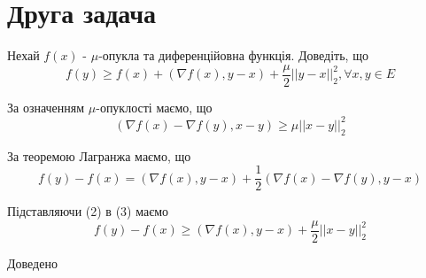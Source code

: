 \section{Друга задача}


\begin{tcolorbox}[title = Друга задача]
    Нехай $f(x)$ - $\mu$-опукла та диференційовна функція. Доведіть, що 
    \begin{equation}
        f(y) \geq f(x) + (\nabla f(x) , y - x) + \frac{\mu}{2} ||y - x||_2^2, \forall x, y \in E
    \end{equation}
\end{tcolorbox}

За означенням $\mu$-опуклості маємо, що 
\begin{equation}
    (\nabla f(x) - \nabla f(y), x - y) \geq \mu ||x - y||_2^2
\end{equation}

За теоремою Лагранжа маємо, що
\begin{equation}
    f(y) - f(x) = (\nabla f(x), y - x) + \frac{1}{2} (\nabla f(x) - \nabla f(y), y - x)
\end{equation}

Підставляючи (2) в (3) маємо
\begin{equation}
    f(y) - f(x) \geq (\nabla f(x), y - x) + \frac{\mu}{2} ||x - y||_2^2
\end{equation}

Доведено